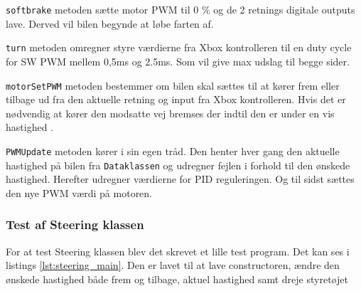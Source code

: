 \clearpage

\texttt{softbrake} metoden sætte motor PWM til 0 \% og de 2 retnings digitale outputs lave. 
Derved vil bilen begynde at løbe farten af.


\texttt{turn} metoden omregner styre værdierne fra Xbox kontrolleren til en duty cycle for SW PWM mellem 0,5ms og 2.5ms. 
Som vil give max udslag til begge sider. 


\texttt{motorSetPWM} metoden bestemmer om bilen skal sættes til at kører frem eller tilbage ud fra den aktuelle retning og input fra Xbox kontrolleren. 
Hvis det er nødvendig at kører den modsatte vej bremses der indtil den er under en vis hastighed
. 


\texttt{PWMUpdate} metoden kører i sin egen tråd. Den henter hver gang den aktuelle hastighed på bilen fra \texttt{Dataklassen} og udregner fejlen i forhold til den ønskede hastighed. Herefter udregner værdierne for PID reguleringen. Og til sidst sættes den nye PWM værdi på motoren. 


\subsubsection{Test af Steering klassen}

For at test Steering klassen blev det skrevet et lille test program. Det kan ses i listings \ref{lst:steering_main}. Den er lavet til at lave constructoren, ændre den ønskede hastighed både frem og tilbage, aktuel hastighed samt dreje styretøjet




